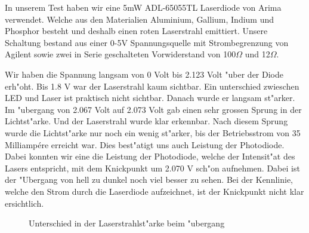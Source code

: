 \begin{refsection}
In unserem Test haben wir eine 5mW ADL-65055TL Laserdiode von Arima verwendet. 
Welche aus den Materialien Aluminium, Gallium, Indium und Phosphor besteht und 
deshalb einen roten Laserstrahl emittiert. Unsere Schaltung bestand aus einer 
0-5V Spannungsquelle mit Strombegrenzung von Agilent sowie zwei in Serie 
geschalteten Vorwiderstand von 100$\Omega$ und 12$\Omega$. 

Wir haben die Spannung langsam von 0 Volt bis 2.123 Volt "uber der Diode 
erh"oht. Bis 1.8 V war der Laserstrahl kaum sichtbar. Ein unterschied zwieschen 
LED und Laser ist praktisch nicht sichtbar. Danach wurde er langsam 
st"arker. Im "ubergang von 2.067 Volt auf 2.073 Volt gab einen sehr grossen 
Sprung in der Lichtst"arke. Und der Laserstrahl wurde klar erkennbar.
Nach diesem Sprung wurde die Lichtst"arke nur noch 
ein wenig st"arker, bis der Betriebsstrom von 35 Milliampére erreicht war. 
Dies best"atigt uns auch Leistung der Photodiode. Dabei konnten wir eine 
die Leistung der Photodiode, welche der Intensit"at des Lasers entspricht,
mit dem Knickpunkt um 2.070 V sch"on aufnehmen. 
Dabei ist 
der "Ubergang von hell zu dunkel noch viel besser zu sehen. Bei der Kennlinie, 
welche den Strom durch die Laserdiode aufzeichnet, ist der Knickpunkt nicht 
klar ersichtlich.

\begin{figure}
\centering
{}\hfill
{}
\caption{Unterschied in der Laserstrahlst"arke beim "ubergang}
\label{fig:faecher}
\end{figure}


\end{refsection}
